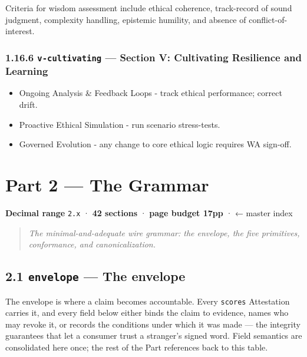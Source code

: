 \documentclass[11pt]{article}
\begin{document}
Criteria for wisdom assessment include ethical coherence, track-record of sound judgment, complexity handling, epistemic humility, and absence of conflict-of-interest.


\subsubsection*{1.16.6 \texttt{v-cultivating} — Section V: Cultivating Resilience and Learning}


\begin{itemize}\setlength\itemsep{0pt}
\item Ongoing Analysis \& Feedback Loops - track ethical performance; correct drift.
\item Proactive Ethical Simulation - run scenario stress-tests.
\item Governed Evolution - any change to core ethical logic requires WA sign-off.
\end{itemize}


\clearpage
\section*{Part 2 — The Grammar}


\textbf{Decimal range} \texttt{2.x} · \textbf{42 sections} · \textbf{page budget 17pp} · ← master index


\begin{quote}\itshape The minimal-and-adequate wire grammar: the envelope, the five primitives, conformance, and canonicalization.\end{quote}



\subsection*{2.1 \texttt{envelope} — The envelope}


The envelope is where a claim becomes accountable. Every \texttt{scores} Attestation carries it, and every field below either binds the claim to evidence, names who may revoke it, or records the conditions under which it was made — the integrity guarantees that let a consumer trust a stranger's signed word. Field semantics are consolidated here once; the rest of the Part references back to this table.
\end{document}

